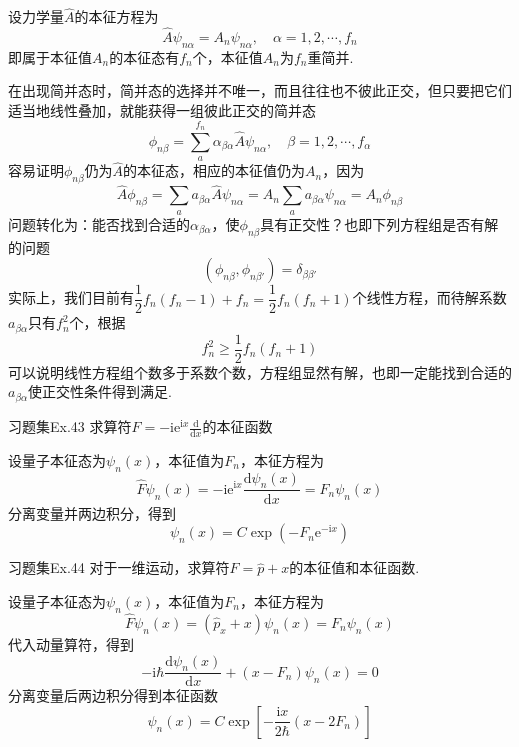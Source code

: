 设力学量$\hat{A}$的本征方程为
$$
    \hat{A}\psi_{n\alpha}=A_n\psi_{n\alpha}, \quad \alpha =1, 2, \cdots, f_n
$$
即属于本征值$A_n$的本征态有$f_n$个，本征值$A_n$为$f_n$重简并.

在出现简并态时，简并态的选择并不唯一，而且往往也不彼此正交，但只要把它们适当地线性叠加，就能获得一组彼此正交的简并态
$$
    \phi_{n\beta} = \sum_{a}^{f_n} \alpha_{\beta\alpha}\hat{A}\psi_{n\alpha}, \quad \beta = 1, 2, \cdots, f_{\alpha}
$$
容易证明$\phi_{n\beta}$仍为$\hat{A}$的本征态，相应的本征值仍为$A_n$，因为
$$
    \hat{A}\phi_{n\beta}
    = \sum_{a}a_{\beta\alpha}\hat{A}\psi_{n\alpha}
    = A_n\sum_{a}a_{\beta\alpha}\psi_{n\alpha}
    = A_n\phi_{n\beta}
$$
问题转化为：能否找到合适的$\alpha_{\beta\alpha}$，使$\phi_{n\beta}$具有正交性？也即下列方程组是否有解的问题
$$
    \left(\phi_{n\beta}, \phi_{n\beta'}\right)=\delta_{\beta\beta'}
$$
实际上，我们目前有$\dfrac{1}{2}f_n(f_n-1)+f_n=\dfrac{1}{2}f_n(f_n+1)$个线性方程，而待解系数$a_{\beta\alpha}$只有$f_n^2$个，根据
$$
    f_n^2 \geqslant \frac{1}{2}f_n(f_n+1)
$$
可以说明线性方程组个数多于系数个数，方程组显然有解，也即一定能找到合适的$a_{\beta\alpha}$使正交性条件得到满足.

\begin{question}{习题集Ex.43}
    求算符$\displaystyle \hat{F}=-\mathrm{ie}^{\mathrm{i}x}\frac{\mathrm{d}}{\mathrm{d}x}$的本征函数
\end{question}
\begin{solution}
    设量子本征态为$\psi_n(x)$，本征值为$F_n$，本征方程为
    $$
        \hat{F}\psi_n(x) = -\mathrm{ie}^{\mathrm{i}x}\frac{\mathrm{d}\psi_n(x)}{\mathrm{d}x} = F_n\psi_n(x)
    $$
    分离变量并两边积分，得到
    $$
        \psi_n(x)=C\exp\left(-F_n\mathrm{e}^{-\mathrm{i}x}\right)
    $$
\end{solution}



\begin{question}{习题集Ex.44}
    对于一维运动，求算符$\hat{F}=\hat{p}+x$的本征值和本征函数.
\end{question}
\begin{solution}
    设量子本征态为$\psi_n(x)$，本征值为$F_n$，本征方程为
    $$
        \hat{F}\psi_n(x) = (\hat{p}_x+x)\psi_n(x) = F_n\psi_n(x)
    $$
    代入动量算符，得到
    $$
        -\mathrm{i}\hbar\frac{\mathrm{d}\psi_n(x)}{\mathrm{d}x}+(x-F_n)\psi_n(x)=0
    $$
    分离变量后两边积分得到本征函数
    $$
        \psi_n(x) = C\exp\left[-\frac{\mathrm{i}x}{2\hbar}(x-2F_n)\right]
    $$
\end{solution}



